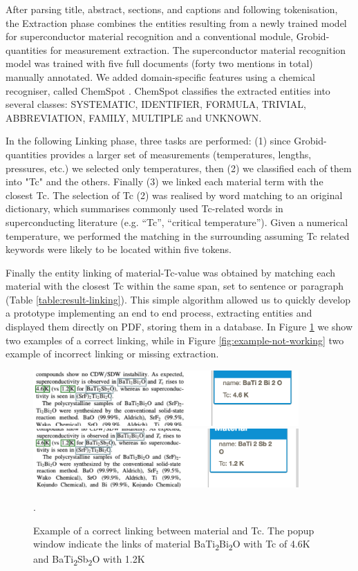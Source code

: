 \documentclass{article}[a4]
\begin{document}
After parsing title, abstract, sections, and captions and following tokenisation, the Extraction phase combines the entities resulting from a newly trained model for superconductor material recognition and a conventional module, Grobid-quantities for measurement extraction. The superconductor material recognition model was trained with five full documents (forty two mentions in total) manually annotated. We added domain-specific features using a chemical recogniser, called ChemSpot \cite{10.1093/bioinformatics/bts183}. ChemSpot classifies the extracted entities into several classes: SYSTEMATIC, IDENTIFIER, FORMULA, TRIVIAL, ABBREVIATION, FAMILY, MULTIPLE and UNKNOWN.

In the following Linking phase, three tasks are performed: (1) since Grobid-quantities provides a larger set of measurements (temperatures, lengths, pressures, etc.) we selected only temperatures, then (2) we classified each of them into "Tc" and the others. Finally (3) we linked each material term with the closest Tc. 
The selection of Tc (2) was realised by word matching to an original dictionary, which summarises commonly used Tc-related words in superconducting literature (e.g. “Tc”, “critical temperature”). Given a numerical temperature, we performed the matching in the surrounding assuming Tc related keywords were likely to be located within five tokens. 

Finally the entity linking of material-Tc-value was obtained by matching each material with the closest Tc within the same span, set to sentence or paragraph (Table \ref{table:result-linking}).
This simple algorithm allowed us to quickly develop a prototype implementing an end to end process, extracting entities and displayed them directly on PDF, storing them in a database. In Figure \ref{fig:example-working} we show two examples of a correct linking, while in Figure \ref{fig:example-not-working} two example of incorrect linking or missing extraction. 

\begin{figure}[h]
    \centering
    \includegraphics[width=4in]{example1} 
    \includegraphics[width=4in]{example2}
    \caption{Example of a correct linking between material and Tc. The popup window indicate the links of material BaTi\textsubscript{2}Bi\textsubscript{2}O with Tc of 4.6K and BaTi\textsubscript{2}Sb\textsubscript{2}O with 1.2K}.
    \label{fig:example-working}
\end{figure}
\end{document}
